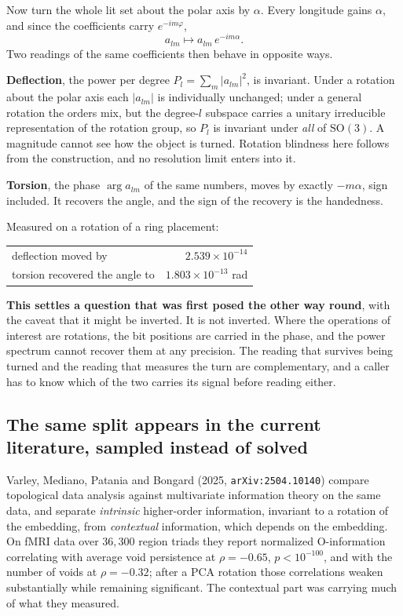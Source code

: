 Now turn the whole lit set about the polar axis by \(\alpha\). Every longitude gains \(\alpha\), and since the coefficients carry \(e^{-im\varphi}\),
\[
  a_{lm} \longmapsto a_{lm} \, e^{-im\alpha}.
\]
Two readings of the same coefficients then behave in opposite ways.

\textbf{Deflection}, the power per degree \(P_l = \sum_m |a_{lm}|^2\), is invariant. Under a rotation about the polar axis each \(|a_{lm}|\) is individually unchanged; under a general rotation the orders mix, but the degree-\(l\) subspace carries a unitary irreducible representation of the rotation group, so \(P_l\) is invariant under \emph{all} of \(\mathrm{SO}(3)\). A magnitude cannot see how the object is turned. Rotation blindness here follows from the construction, and no resolution limit enters into it.

\textbf{Torsion}, the phase \(\arg a_{lm}\) of the same numbers, moves by exactly \(-m\alpha\), sign included. It recovers the angle, and the sign of the recovery is the handedness.

Measured on a rotation of a ring placement:

\begin{center}
\begin{tabular}{lr}
\toprule
deflection moved by & \(2.539 \times 10^{-14}\) \\
torsion recovered the angle to & \(1.803 \times 10^{-13}\) rad \\
\bottomrule
\end{tabular}
\end{center}

\textbf{This settles a question that was first posed the other way round}, with the caveat that it might be inverted. It is not inverted. Where the operations of interest are rotations, the bit positions are carried in the phase, and the power spectrum cannot recover them at any precision. The reading that survives being turned and the reading that measures the turn are complementary, and a caller has to know which of the two carries its signal before reading either.

\subsection{The same split appears in the current literature, sampled instead of solved}

Varley, Mediano, Patania and Bongard (2025, \texttt{arXiv:2504.10140}) compare topological data analysis against multivariate information theory on the same data, and separate \emph{intrinsic} higher-order information, invariant to a rotation of the embedding, from \emph{contextual} information, which depends on the embedding. On fMRI data over \(36{,}300\) region triads they report normalized O-information correlating with average void persistence at \(\rho = -0.65\), \(p < 10^{-100}\), and with the number of voids at \(\rho = -0.32\); after a PCA rotation those correlations weaken substantially while remaining significant. The contextual part was carrying much of what they measured.

